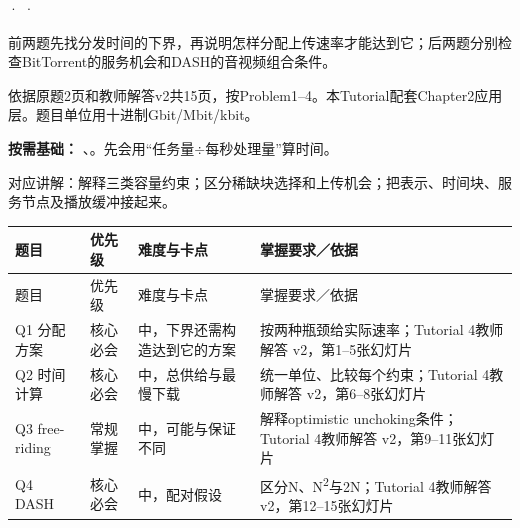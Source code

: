





 ·  · 


前两题先找分发时间的下界，再说明怎样分配上传速率才能达到它；后两题分别检查BitTorrent的服务机会和DASH的音视频组合条件。

依据原题2页和教师解答v2共15页，按Problem1–4。本Tutorial配套Chapter2应用层。题目单位用十进制Gbit/Mbit/kbit。


\textbf{按需基础：} 、。先会用“任务量\ensuremath{\div}每秒处理量”算时间。


对应讲解：解释三类容量约束；区分稀缺块选择和上传机会；把表示、时间块、服务节点及播放缓冲接起来。


\begingroup
\small\setlength{\tabcolsep}{3pt}
\renewcommand{\arraystretch}{1.22}
\begin{longtable}{@{}>{\raggedright\arraybackslash}p{}>{\raggedright\arraybackslash}p{}>{\raggedright\arraybackslash}p{}>{\raggedright\arraybackslash}p{}@{}}
\toprule
题目 & 优先级 & 难度与卡点 & 掌握要求／依据 \\
\midrule\endfirsthead
题目 & 优先级 & 难度与卡点 & 掌握要求／依据 \\
\midrule\endhead
\bottomrule\endfoot
Q1 分配方案 & 核心必会 & 中，下界还需构造达到它的方案 & 按两种瓶颈给实际速率；Tutorial 4教师解答 v2，第1–5张幻灯片 \\
Q2 时间计算 & 核心必会 & 中，总供给与最慢下载 & 统一单位、比较每个约束；Tutorial 4教师解答 v2，第6–8张幻灯片 \\
Q3 free-riding & 常规掌握 & 中，可能与保证不同 & 解释optimistic unchoking条件；Tutorial 4教师解答 v2，第9–11张幻灯片 \\
Q4 DASH & 核心必会 & 中，配对假设 & 区分N、N\textsuperscript{2}与2N；Tutorial 4教师解答 v2，第12–15张幻灯片 \\
\end{longtable}
\endgroup







